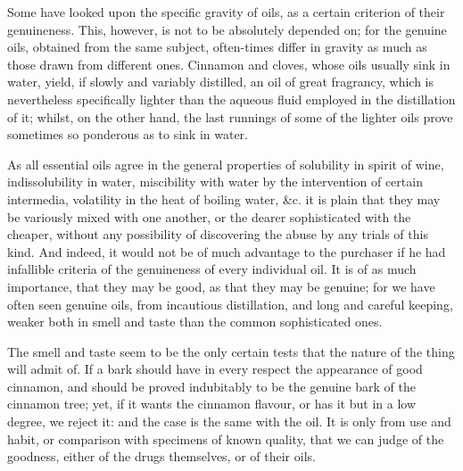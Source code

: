 \documentclass{article}
\begin{document}
Some have looked upon the specific gravity of oils, as a certain criterion of their genuineness. This, however, is not to be absolutely depended on; for the genuine oils, obtained from the same subject, often-times differ in gravity as much as those drawn from different ones. Cinnamon and cloves, whose oils usually sink in water, yield, if slowly and variably distilled, an oil of great fragrancy, which is nevertheless specifically lighter than the aqueous fluid employed in the distillation of it; whilst, on the other hand, the last runnings of some of the lighter oils prove sometimes so ponderous as to sink in water.

As all essential oils agree in the general properties of solubility in spirit of wine, indissolubility in water, miscibility with water by the intervention of certain intermedia, volatility in the heat of boiling water, \&c. it is plain that they may be variously mixed with one another, or the dearer sophisticated with the cheaper, without any possibility of discovering the abuse by any trials of this kind. And indeed, it would not be of much advantage to the purchaser if he had infallible criteria of the genuineness of every individual oil. It is of as much importance, that they may be good, as that they may be genuine; for we have often seen genuine oils, from incautious distillation, and long and careful keeping, weaker both in smell and taste than the common sophisticated ones.

The smell and taste seem to be the only certain tests that the nature of the thing will admit of. If a bark should have in every respect the appearance of good cinnamon, and should be proved indubitably to be the genuine bark of the cinnamon tree; yet, if it wants the cinnamon flavour, or has it but in a low degree, we reject it: and the case is the same with the oil. It is only from use and habit, or comparison with specimens of known quality, that we can judge of the goodness, either of the drugs themselves, or of their oils.
\end{document}
